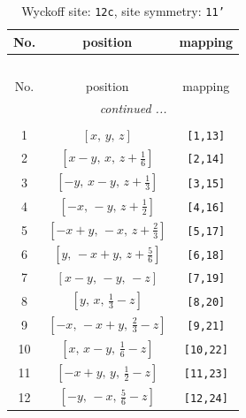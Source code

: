 \documentclass[fleqn,8pt]{jsarticle}
\begin{document}
\begin{longtable}{ccc}
\caption{Wyckoff site: {\tt 12c}, site symmetry: {\tt 11'}}
 \\
 \hline \hline
No. & position & mapping \\ \hline \endfirsthead

\multicolumn{2}{l}{\tablename\ \thetable{}} \\
 \hline \hline
No. & position & mapping \\ \hline \endhead

 \hline \hline
\multicolumn{2}{r}{\footnotesize\it continued ...} \\ \endfoot

 \hline \hline
\multicolumn{2}{r}{} \\ \endlastfoot

1 & $\left[ x,\, y,\, z \right]$ & {\tt [1,13]} \\ \hline
2 & $\left[ x - y,\, x,\, z + \frac{1}{6} \right]$ & {\tt [2,14]} \\ \hline
3 & $\left[ - y,\, x - y,\, z + \frac{1}{3} \right]$ & {\tt [3,15]} \\ \hline
4 & $\left[ - x,\, - y,\, z + \frac{1}{2} \right]$ & {\tt [4,16]} \\ \hline
5 & $\left[ - x + y,\, - x,\, z + \frac{2}{3} \right]$ & {\tt [5,17]} \\ \hline
6 & $\left[ y,\, - x + y,\, z + \frac{5}{6} \right]$ & {\tt [6,18]} \\ \hline
7 & $\left[ x - y,\, - y,\, - z \right]$ & {\tt [7,19]} \\ \hline
8 & $\left[ y,\, x,\, \frac{1}{3} - z \right]$ & {\tt [8,20]} \\ \hline
9 & $\left[ - x,\, - x + y,\, \frac{2}{3} - z \right]$ & {\tt [9,21]} \\ \hline
10 & $\left[ x,\, x - y,\, \frac{1}{6} - z \right]$ & {\tt [10,22]} \\ \hline
11 & $\left[ - x + y,\, y,\, \frac{1}{2} - z \right]$ & {\tt [11,23]} \\ \hline
12 & $\left[ - y,\, - x,\, \frac{5}{6} - z \right]$ & {\tt [12,24]} \\
\end{longtable}
\end{document}
